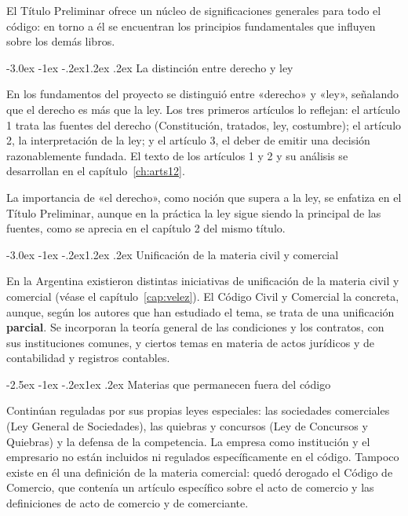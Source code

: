 \documentclass[12pt,oneside]{book}
\makeatletter
\renewcommand\section{\@startsection{section}{1}{\z@}%
  {-3.0ex \@plus -1ex \@minus -.2ex}{1.2ex \@plus .2ex}%
  {\normalfont\large\bfseries\color{acento}}}
\renewcommand\subsection{\@startsection{subsection}{2}{\z@}%
  {-2.5ex \@plus -1ex \@minus -.2ex}{1ex \@plus .2ex}%
  {\normalfont\normalsize\bfseries}}
\makeatother
\begin{document}
\begin{importante}
El Título Preliminar ofrece un núcleo de significaciones generales para todo el código: en torno a él se encuentran los principios fundamentales que influyen sobre los demás libros.
\end{importante}

\section{La distinción entre derecho y ley}

En los fundamentos del proyecto se distinguió entre «derecho» y «ley», señalando que el derecho es más que la ley. Los tres primeros artículos lo reflejan: el artículo 1 trata las fuentes del derecho (Constitución, tratados, ley, costumbre); el artículo 2, la interpretación de la ley; y el artículo 3, el deber de emitir una decisión razonablemente fundada. El texto de los artículos 1 y 2 y su análisis se desarrollan en el capítulo~\ref{ch:arts12}.

La importancia de «el derecho», como noción que supera a la ley, se enfatiza en el Título Preliminar, aunque en la práctica la ley sigue siendo la principal de las fuentes, como se aprecia en el capítulo 2 del mismo título.

\section{Unificación de la materia civil y comercial}

En la Argentina existieron distintas iniciativas de unificación de la materia civil y comercial (véase el capítulo~\ref{cap:velez}). El Código Civil y Comercial la concreta, aunque, según los autores que han estudiado el tema, se trata de una unificación \textbf{parcial}. Se incorporan la teoría general de las condiciones y los contratos, con sus instituciones comunes, y ciertos temas en materia de actos jurídicos y de contabilidad y registros contables.

\subsection{Materias que permanecen fuera del código}

Continúan reguladas por sus propias leyes especiales: las sociedades comerciales (Ley General de Sociedades), las quiebras y concursos (Ley de Concursos y Quiebras) y la defensa de la competencia. La empresa como institución y el empresario no están incluidos ni regulados específicamente en el código. Tampoco existe en él una definición de la materia comercial: quedó derogado el Código de Comercio, que contenía un artículo específico sobre el acto de comercio y las definiciones de acto de comercio y de comerciante.
\end{document}
